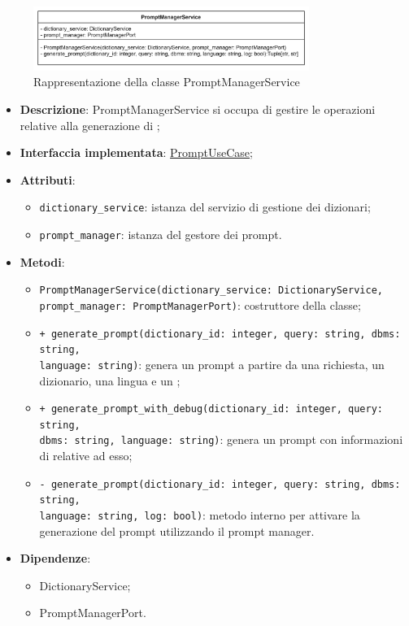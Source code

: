 \label{PromptManagementService}
\begin{figure}[H]
    \centering
    \includegraphics[width=0.8\textwidth]{assets/Backend/prompt_manager_service.png}
    \caption{Rappresentazione della classe PromptManagerService}
  \end{figure}
\begin{itemize}
    \item \textbf{Descrizione}: PromptManagerService si occupa di gestire le operazioni relative alla generazione di ;
    \item \textbf{Interfaccia implementata}: \hyperref[PromptUseCase]{PromptUseCase};
    \item \textbf{Attributi}:
    \begin{itemize}
        \item \texttt{dictionary\_service}: istanza del servizio di gestione dei dizionari;
        \item \texttt{prompt\_manager}: istanza del gestore dei prompt.
    \end{itemize}
    \item \textbf{Metodi}:
    \begin{itemize}
        \item \texttt{PromptManagerService(dictionary\_service: DictionaryService, prompt\_manager: PromptManagerPort)}: costruttore della classe;
        \item \texttt{+ generate\_prompt(dictionary\_id: integer, query: string, dbms: string,\\ language: string)}: genera un prompt a partire da una richiesta, un dizionario, una lingua e un ;
        \item \texttt{+ generate\_prompt\_with\_debug(dictionary\_id: integer, query: string, \\ dbms: string, language: string)}: genera un prompt con informazioni di  relative ad esso;
        \item \texttt{- generate\_prompt(dictionary\_id: integer, query: string, dbms: string,\\ language: string, log: bool)}: metodo interno per attivare la generazione del prompt utilizzando il prompt manager.
    \end{itemize}
    \item \textbf{Dipendenze}:
    \begin{itemize}
        \item DictionaryService;
        \item PromptManagerPort.
    \end{itemize}
\end{itemize}  